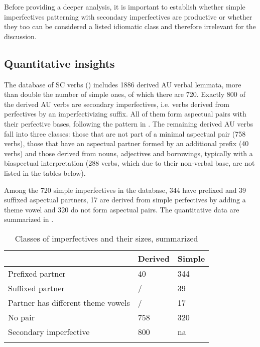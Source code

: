 \documentclass[output=paper]{langscibook}
\begin{document}
Before providing a deeper analysis, it is important to establish whether simple imperfectives patterning with secondary imperfectives are productive or wheth\-er they too can be considered a listed idiomatic class and therefore irrelevant for the discussion.

\subsection{Quantitative insights}\label{ars:sec:Quantins}

The database of SC verbs (\cite{Arsetal.2021}) includes 1886 derived AU verbal lemmata, more than double the number of simple ones, of which there are 720. Exactly 800 of the derived AU verbs are secondary imperfectives, i.e. verbs derived from perfectives by an imperfectivizing suffix. All of them form aspectual pairs with their perfective bases, following the pattern in . The remaining derived AU verbs fall into three classes: those that are not part of a minimal aspectual pair (758 verbs), those that have an aspectual partner formed by an additional prefix (40 verbs) and those derived from nouns, adjectives and  borrowings, typically with a biaspectual interpretation (288 verbs, which due to their non-verbal base, are not listed in the tables below).

Among the 720 simple imperfectives in the database, 344 have prefixed and 39 suffixed aspectual partners, 17 are derived from simple perfectives by adding a theme vowel and 320 do not form aspectual pairs. The quantitative data are summarized in .


\begin{table}
\begin{tabularx}{.75\textwidth}{lYY}
\lsptoprule
&Derived&Simple\\\midrule
 Prefixed partner &40&344\\
 Suffixed partner &\slash &39\\
 Partner has different theme vowels &\slash &17\\
 No pair &758&320\\
 Secondary imperfective&800&na \\ 
\lspbottomrule
\end{tabularx} \caption{Classes of imperfectives and their sizes, summarized} \label{ars:tab:quanti}
\end{table}
\end{document}
